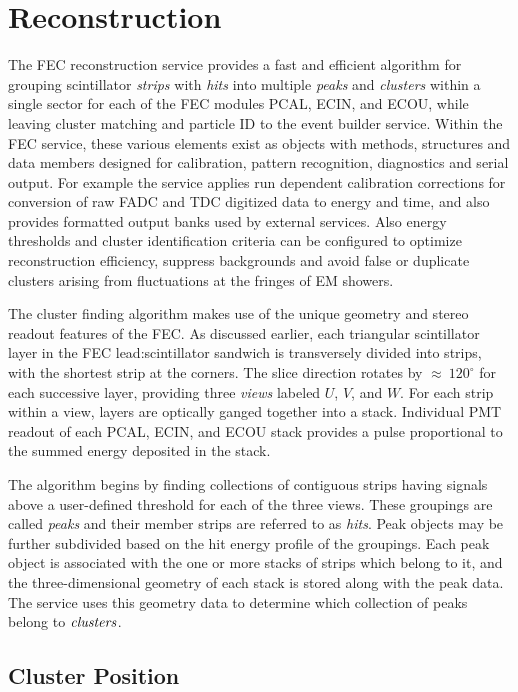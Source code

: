 \documentclass{elsart}
\begin{document}
\section{Reconstruction}

The FEC reconstruction service provides a fast and efficient algorithm for grouping scintillator {\it strips} with
{\it hits} into multiple {\it peaks} and {\it clusters} within a single sector for each of the FEC modules PCAL, ECIN,
and ECOU, while leaving cluster matching and particle ID to the event builder service.  Within the FEC service, these
various elements exist as objects with methods, structures and data members designed for calibration, pattern
recognition, diagnostics and serial output.  For example the service applies run dependent calibration corrections for
conversion of raw FADC and TDC digitized data to energy and time, and also provides formatted output banks used by
external services.  Also energy thresholds and cluster identification criteria can be configured to optimize reconstruction
efficiency, suppress backgrounds and avoid false or duplicate clusters arising from fluctuations at the fringes of EM
showers. 

The cluster finding algorithm makes use of the unique geometry and stereo readout features of the FEC. As discussed
earlier, each triangular scintillator layer in the FEC lead:scintillator sandwich is transversely divided into strips, with the
shortest strip at the corners. The slice direction rotates by $\approx~120^{\circ}$ for each successive layer, providing
three {\it views} labeled $U$, $V$, and $W$.  For each strip within a view, layers are optically ganged together into a
stack.  Individual PMT readout of each PCAL, ECIN, and ECOU stack provides a pulse proportional to the summed energy
deposited in the stack.

The algorithm begins by finding collections of contiguous strips having signals above a user-defined threshold for each of
the three views. These groupings are called {\it peaks} and their member strips are referred to as {\it hits}.  Peak objects
may be further subdivided based on the hit energy profile of the groupings.  Each peak object is associated with the one or
more stacks of strips which belong to it, and the three-dimensional geometry of each stack is stored along with the peak
data. The service uses this geometry data to determine which collection of peaks belong to $\it{clusters}$. 

\subsection {Cluster Position}
\end{document}
